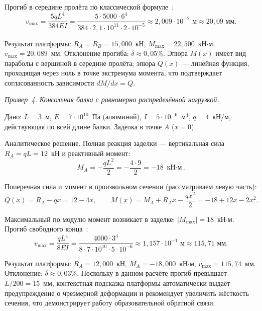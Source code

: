 Прогиб в середине пролёта по классической формуле~\cite{feodosev}:
\begin{equation}
  v_{\max} = \frac{5 q L^4}{384 E I} = \frac{5 \cdot 5000 \cdot 6^4}{384 \cdot 2{,}1 \cdot 10^{11} \cdot 2 \cdot 10^{-5}} \approx 2{,}009 \cdot 10^{-2} \text{ м} \approx 20{,}09 \text{ мм}.
  \label{eq:ex3_vmax}
\end{equation}

Результат платформы: $R_A = R_B = 15{,}000$~кН, $M_{\max} = 22{,}500$~кН$\cdot$м, $v_{\max} = 20{,}089$~мм. Отклонение прогиба: $\delta \approx 0{,}05\%$. Эпюра $M(x)$ имеет вид параболы с вершиной в середине пролёта; эпюра $Q(x)$ --- линейная функция, проходящая через ноль в точке экстремума момента, что подтверждает согласованность зависимости $dM/dx = Q$.

\textit{Пример~4. Консольная балка с равномерно распределённой нагрузкой.}

Дано: $L = 3$~м, $E = 7 \cdot 10^{10}$~Па (алюминий), $I = 5 \cdot 10^{-6}$~м$^4$, $q = 4$~кН/м, действующая по всей длине балки. Заделка в точке $A$ ($x = 0$).

Аналитическое решение. Полная реакция заделки --- вертикальная сила $R_A = q L = 12$~кН и реактивный момент:
\begin{equation}
  M_A = -\frac{q L^2}{2} = -\frac{4 \cdot 9}{2} = -18 \text{ кН$\cdot$м}.
  \label{eq:ex4_reactions}
\end{equation}

Поперечная сила и момент в произвольном сечении (рассматриваем левую часть):
\begin{equation}
  Q(x) = R_A - q x = 12 - 4 x, \qquad M(x) = M_A + R_A x - \frac{q x^2}{2} = -18 + 12 x - 2 x^2.
  \label{eq:ex4_QM}
\end{equation}

Максимальный по модулю момент возникает в заделке: $|M_{\max}| = 18$~кН$\cdot$м. Прогиб свободного конца~\cite{gere2018}:
\begin{equation}
  v_{\max} = \frac{q L^4}{8 E I} = \frac{4000 \cdot 3^4}{8 \cdot 7 \cdot 10^{10} \cdot 5 \cdot 10^{-6}} \approx 1{,}157 \cdot 10^{-1} \text{ м} \approx 115{,}71 \text{ мм}.
  \label{eq:ex4_vmax}
\end{equation}

Результат платформы: $R_A = 12{,}000$~кН, $M_A = -18{,}000$~кН$\cdot$м, $v_{\max} = 115{,}74$~мм. Отклонение: $\delta \approx 0{,}03\%$. Поскольку в данном расчёте прогиб превышает $L/200 = 15$~мм, контекстная подсказка платформы автоматически выдаёт предупреждение о чрезмерной деформации и рекомендует увеличить жёсткость сечения, что демонстрирует работу образовательной обратной связи.

